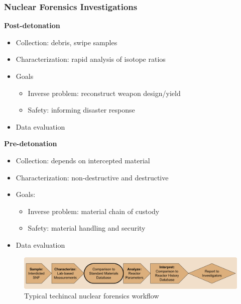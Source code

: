 \begin{frame}
  \frametitle{Nuclear Forensics Investigations}
  \begin{adjustwidth}{-10pt}{0pt}
  \begin{minipage}[t]{0.5\textwidth}
    \textbf{Post-detonation}
    \begin{itemize}
      \item Collection: debris, swipe samples
      \item Characterization: rapid analysis of isotope ratios
      \item Goals
      \begin{itemize}
        \item Inverse problem: reconstruct weapon design/yield
        \item Safety: informing disaster response
      \end{itemize}
      \item Data evaluation
    \end{itemize}
  \end{minipage}%
  \hfill
  \begin{minipage}[t]{0.5\textwidth}
    \textbf{Pre-detonation}
    \begin{itemize}
      \item Collection: depends on intercepted material
      \item Characterization: non-destructive and destructive
      \item Goals:
      \begin{itemize}
        \item Inverse problem: material chain of custody
        \item Safety: material handling and security
      \end{itemize}
      \item Data evaluation
    \end{itemize}
  \end{minipage}
  \begin{figure}
    \centering
    \includegraphics[width=\textwidth]{./figures/forensicsrealworld.png}
    \caption{Typical techincal nuclear forensics workflow}
  \end{figure}
  \end{adjustwidth}
\end{frame}

